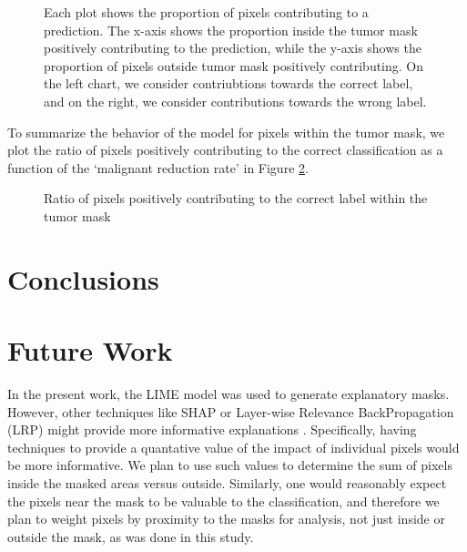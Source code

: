 \documentclass[sn-mathphys,Numbered]{sn-jnl}%
\theoremstyle{thmstyleone}%
\theoremstyle{thmstyletwo}%
\theoremstyle{thmstylethree}%
\begin{document}
\begin{figure}[!htbp]
    \centering


    \caption{Each plot shows the proportion of pixels contributing to a prediction.  The x-axis shows the proportion inside the tumor mask positively contributing to the prediction, while the y-axis shows the proportion of pixels outside tumor mask positively contributing.  On the left chart, we consider contriubtions towards the correct label, and on the right, we consider contributions towards the wrong label.}
    \label{fig:proportion}
\end{figure}



To summarize the behavior of the model for pixels within the tumor mask, we plot the ratio of pixels positively contributing to the correct classification as a function of the `malignant reduction rate' in Figure \ref{fig:mal_ben_line}.
\begin{figure}[!htbp]
    \centering


    \caption{Ratio of pixels positively contributing to the correct label within the tumor mask}
    \label{fig:mal_ben_line}
\end{figure}
\section{Conclusions}\label{sec_conclusion}

\section{Future Work}\label{sec_future}

In the present work, the LIME model was used to generate explanatory masks.  However, other techniques like SHAP or Layer-wise Relevance BackPropagation (LRP) might provide more informative explanations \cite{SALEEM2022165}.  Specifically, having techniques to provide a quantative value of the impact of individual pixels would be more informative.  We plan to use such values to determine the sum of pixels inside the masked areas versus outside.  Similarly, one would reasonably expect the pixels near the mask to be valuable to the classification, and therefore we plan to weight pixels by proximity to the masks for analysis, not just inside or outside the mask, as was done in this study.
\end{document}
